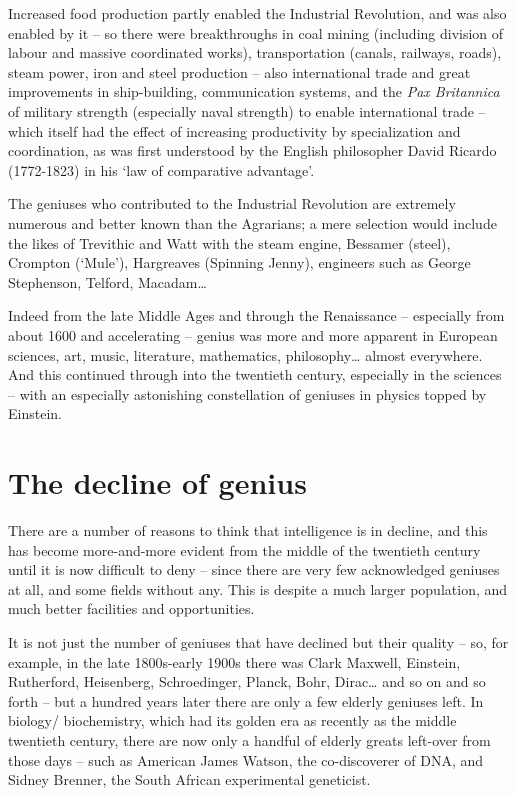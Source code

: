 \documentclass[
]{book}
\begin{document}
Increased food production partly enabled the Industrial Revolution, and was also enabled by it -- so there were breakthroughs in coal mining (including division of labour and massive coordinated works), transportation (canals, railways, roads), steam power, iron and steel production -- also international trade and great improvements in ship-building, communication systems, and the \emph{Pax Britannica} of military strength (especially naval strength) to enable international trade -- which itself had the effect of increasing productivity by specialization and coordination, as was first understood by the English philosopher David Ricardo (1772-1823) in his `law of comparative advantage'.

The geniuses who contributed to the Industrial Revolution are extremely numerous and better known than the Agrarians; a mere selection would include the likes of Trevithic and Watt with the steam engine, Bessamer (steel), Crompton (`Mule'), Hargreaves (Spinning Jenny), engineers such as George Stephenson, Telford, Macadam\ldots{}

Indeed from the late Middle Ages and through the Renaissance -- especially from about 1600 and accelerating -- genius was more and more apparent in European sciences, art, music, literature, mathematics, philosophy\ldots{} almost everywhere. And this continued through into the twentieth century, especially in the sciences -- with an especially astonishing constellation of geniuses in physics topped by Einstein.

\hypertarget{the-decline-of-genius}{%
\section{The decline of genius}\label{the-decline-of-genius}}

There are a number of reasons to think that intelligence is in decline, and this has become more-and-more evident from the middle of the twentieth century until it is now difficult to deny -- since there are very few acknowledged geniuses at all, and some fields without any. This is despite a much larger population, and much better facilities and opportunities.

It is not just the number of geniuses that have declined but their quality -- so, for example, in the late 1800s-early 1900s there was Clark Maxwell, Einstein, Rutherford, Heisenberg, Schroedinger, Planck, Bohr, Dirac\ldots{} and so on and so forth -- but a hundred years later there are only a few elderly geniuses left. In biology/ biochemistry, which had its golden era as recently as the middle twentieth century, there are now only a handful of elderly greats left-over from those days -- such as American James Watson, the co-discoverer of DNA, and Sidney Brenner, the South African experimental geneticist.
\end{document}
